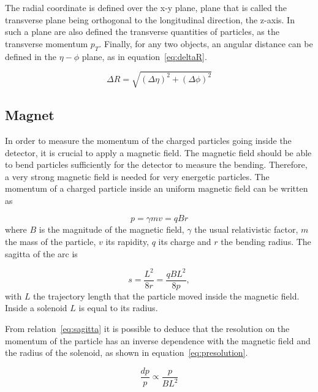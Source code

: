 The radial coordinate is defined over the x-y plane, plane that is called the transverse plane being orthogonal to the longitudinal direction, the z-axis. In such a plane are also defined the transverse quantities of particles, as the transverse momentum $p_{T}$. Finally, for any two objects, an angular distance can be defined in the $\eta-\phi$ plane, as in equation~\ref{eq:deltaR}.

\begin{equation}
  \label{eq:deltaR}
  \Delta R=\sqrt{(\Delta\eta)^{2}+(\Delta\phi)^{2}}
\end{equation}

\subsection{Magnet}
\label{sec:magnet}

In order to measure the momentum of the charged particles going inside the detector, it is crucial to apply a magnetic field. The magnetic field should be able to bend particles sufficiently for the detector to measure the bending. Therefore, a very strong magnetic field is needed for very energetic particles. The momentum of a charged particle inside an uniform magnetic field can be written as

\begin{equation}
  \label{eq:momB}
  p=\gamma m v=qBr
\end{equation} where $B$ is the magnitude of the magnetic field, $\gamma$ the usual relativistic factor, $m$ the mass of the particle, $v$ its rapidity, $q$ its charge and $r$ the bending radius. The sagitta of the arc is

\begin{equation}
  \label{eq:sagitta}
  s=\frac{L^{2}}{8r}=\frac{qBL^{2}}{8p},
\end{equation} with $L$ the trajectory length that the particle moved inside the magnetic field. Inside a solenoid $L$ is equal to its radius. 

From relation~\ref{eq:sagitta} it is possible to deduce that the resolution on the momentum of the particle has an inverse dependence with the magnetic field and the radius of the solenoid, as shown in equation~\ref{eq:presolution}. %

\begin{equation}
  \label{eq:presolution}
  \frac{dp}{p}\propto \frac{p}{BL^{2}}
\end{equation}

